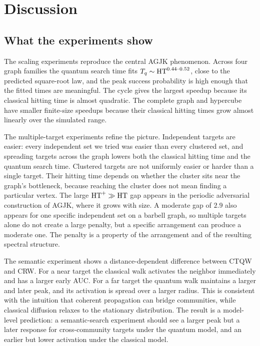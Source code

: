 \section{Discussion}
\label{sec:discussion}

\subsection{What the experiments show}
\label{sec:discussion-findings}

The scaling experiments reproduce the central AGJK phenomenon. Across four
graph families the quantum search time fits $T_q\sim\mathrm{HT}^{0.44\text{--}0.52}$,
close to the predicted square-root law, and the peak success probability is
high enough that the fitted times are meaningful. The cycle gives the largest
speedup because its classical hitting time is almost quadratic. The complete
graph and hypercube have smaller finite-size speedups because their classical
hitting times grow almost linearly over the simulated range.

The multiple-target experiments refine the picture. Independent targets are
easier: every independent set we tried was easier than every clustered set, and
spreading targets across the graph lowers both the classical hitting time and
the quantum search time. Clustered targets are not uniformly easier or harder
than a single target. Their hitting time depends on whether the cluster sits
near the graph's bottleneck, because reaching the cluster does not mean finding
a particular vertex. The large $\mathrm{HT}^+\gg\mathrm{HT}$ gap appears in the periodic
adversarial construction of AGJK, where it grows with size. A moderate gap of
$2.9$ also appears for one specific independent set on a barbell graph, so
multiple targets alone do not create a large penalty, but a specific
arrangement can produce a moderate one. The penalty is a property of the
arrangement and of the resulting spectral structure.

The semantic experiment shows a distance-dependent difference between CTQW and
CRW. For a near target the classical walk activates the neighbor immediately
and has a larger early AUC. For a far target the quantum walk maintains a
larger and later peak, and its activation is spread over a larger radius. This
is consistent with the intuition that coherent propagation can bridge
communities, while classical diffusion relaxes to the stationary distribution.
The result is a model-level prediction: a semantic-search experiment should
see a larger peak but a later response for cross-community targets under the
quantum model, and an earlier but lower activation under the classical model.

